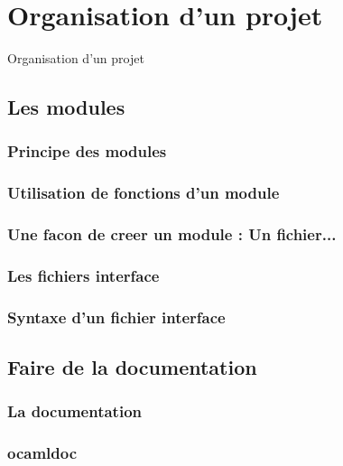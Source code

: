 \section{Organisation d'un projet}

\begin{frame}
	\begin{center}
		\huge
		Organisation d'un projet
	\end{center}
\end{frame}

\subsection{Les modules} %
\begin{frame}
	\frametitle{Principe des modules}
	
\end{frame}

\begin{frame}
	\frametitle{Utilisation de fonctions d'un module}

\end{frame}

\begin{frame}
	\frametitle{Une facon de creer un module : Un fichier...}

\end{frame}

\begin{frame}
	\frametitle{Les fichiers interface}

\end{frame}

\begin{frame}
	\frametitle{Syntaxe d'un fichier interface}

\end{frame}

\subsection{Faire de la documentation} %
\begin{frame}
	\frametitle{La documentation}

\end{frame}

\begin{frame}
	\frametitle{ocamldoc}

\end{frame}

